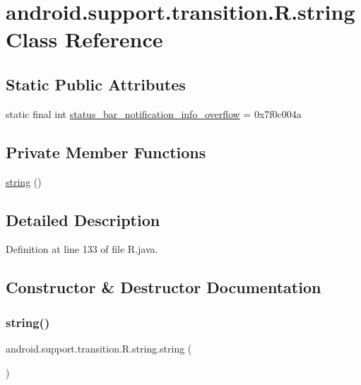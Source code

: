 \hypertarget{classandroid_1_1support_1_1transition_1_1_r_1_1string}{}\section{android.\+support.\+transition.\+R.\+string Class Reference}
\label{classandroid_1_1support_1_1transition_1_1_r_1_1string}
\subsection*{Static Public Attributes}
\begin{DoxyCompactItemize}
\item 
static final int \mbox{\hyperlink{classandroid_1_1support_1_1transition_1_1_r_1_1string_af545e59339bc447d1f12b77542fae31f}{status\+\_\+bar\+\_\+notification\+\_\+info\+\_\+overflow}} = 0x7f0c004a
\end{DoxyCompactItemize}
\subsection*{Private Member Functions}
\begin{DoxyCompactItemize}
\item 
\mbox{\hyperlink{classandroid_1_1support_1_1transition_1_1_r_1_1string_a80a6182823f1d201a4b24c9db8683b56}{string}} ()
\end{DoxyCompactItemize}


\subsection{Detailed Description}


Definition at line 133 of file R.\+java.



\subsection{Constructor \& Destructor Documentation}
\mbox{\label{classandroid_1_1support_1_1transition_1_1_r_1_1string_a80a6182823f1d201a4b24c9db8683b56}} 
\subsubsection{\texorpdfstring{string()}{string()}}
{\footnotesize\ttfamily android.\+support.\+transition.\+R.\+string.\+string (\begin{DoxyParamCaption}{ }\end{DoxyParamCaption})\hspace{0.3cm}{\ttfamily [private]}}



